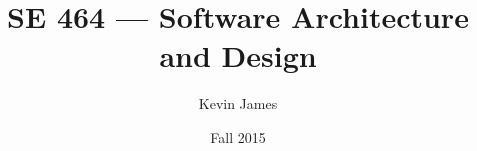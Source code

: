 \documentclass[12pt]{article}
\begin{document}
\title{SE 464 --- Software Architecture and Design}
\author{Kevin James}
\date{\vspace{-2ex}Fall 2015}
\maketitle\HRule

\tableofcontents
\newpage
\end{document}
